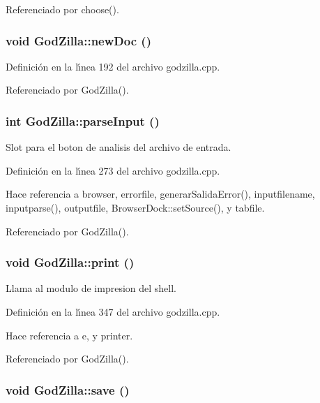 Referenciado por choose().
\subsubsection{\setlength{\rightskip}{0pt plus 5cm}void God\-Zilla::new\-Doc ()\hspace{0.3cm}{\tt  [private, slot]}}\label{classGodZilla_k4}




Definici\'{o}n en la l\'{\i}nea 192 del archivo godzilla.cpp.

Referenciado por God\-Zilla().
\subsubsection{\setlength{\rightskip}{0pt plus 5cm}int God\-Zilla::parse\-Input ()\hspace{0.3cm}{\tt  [private, slot]}}\label{classGodZilla_k10}


Slot para el boton de analisis del archivo de entrada. 



Definici\'{o}n en la l\'{\i}nea 273 del archivo godzilla.cpp.

Hace referencia a browser, errorfile, generar\-Salida\-Error(), inputfilename, inputparse(), outputfile, Browser\-Dock::set\-Source(), y tabfile.

Referenciado por God\-Zilla().
\subsubsection{\setlength{\rightskip}{0pt plus 5cm}void God\-Zilla::print ()\hspace{0.3cm}{\tt  [private, slot]}}\label{classGodZilla_k9}


Llama al modulo de impresion del shell. 



Definici\'{o}n en la l\'{\i}nea 347 del archivo godzilla.cpp.

Hace referencia a e, y printer.

Referenciado por God\-Zilla().
\subsubsection{\setlength{\rightskip}{0pt plus 5cm}void God\-Zilla::save ()\hspace{0.3cm}{\tt  [private, slot]}}\label{classGodZilla_k7}




